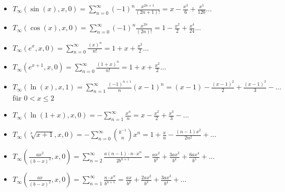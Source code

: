 \documentclass[7pt,landscape, margin = 0.1mm]{article}
\begin{document}
\begin{multicols}{4}
\begin{flushleft}
\begin{itemize}
\item  $T_{\infty}(\sin(x), x,0)= \sum_{n=0}^{\infty}(-1)^n \frac{x^{2n+1}}{(2n+1)!} = x - \frac{x^3}{6}+\frac{x^5}{120} \ldots$
\item
 $T_{\infty}(\cos(x), x,0)= \sum_{n=0}^{\infty}(-1)^n \frac{x^{2n}}{(2n)!} = 1- \frac{x^2}{2}+\frac{x^4}{24} \ldots $
 \item $T_{\infty}(e^{x}, x,0)= \sum_{n=0}^{\infty} \frac{(x)^n}{n!} = 1 + x + \frac{x^2}{2} \ldots $
  \item $T_{\infty}(e^{x+1}, x,0)= \sum_{n=0}^{\infty} \frac{(1+x)^n}{n!} = 1 + x + \frac{x^2}{2} \ldots $
 \item $T_{\infty}(\ln(x), x,1)=\sum_{n=1}^\infty \frac{(-1)^{n+1}}{n}(x-1)^n = (x-1) - \frac{(x-1)^2}{2} + \frac{(x-1)^3}{3} - \ldots$ für $0< x \leq 2$
 \item $T_{\infty}(\ln(1+x), x,0)=-\sum_{n=1}^{\infty}\frac{x^n}{n}=x- \frac{x^2}{2}+\frac{x^3}{3} - \ldots $
 \item $T_{\infty}(\sqrt[k]{x+1}, x,0)=-\sum_{n=0}^{\infty}\binom{k^{-1}}{n}x^n = 1 + \frac{x}{n}-\frac{(n-1)x^2}{2n^2} + \ldots $
 \item $T_{\infty}(\frac{ax^2}{(b-x)^3}, x,0)=\sum_{n=2}^{\infty}\frac{a(n-1) \cdot n  \cdot x^n}{2b^{n+1}}   = \frac{ax^2}{b^3}+\frac{3ax^3}{b^4}+\frac{6ax^4}{b^5} + \ldots $
 \item $T_{\infty}(\frac{ax}{(b-x)^2}, x,0)=\sum_{n=1}^{\infty}\frac{n \cdot x^n }{b^{n+1}} = \frac{ax}{b^2}+\frac{2ax^2}{b^3}+\frac{3ax^3}{b^4} + \ldots $
\end{itemize}
  

\vspace{1mm} \hline \vspace{1mm}


\end{flushleft}
\end{multicols}
\end{document}
